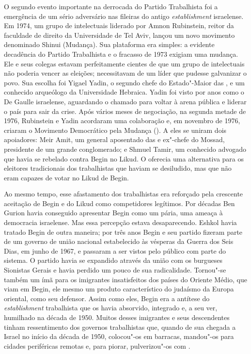 O segundo evento importante na derrocada do Partido Trabalhista foi a
emergência de um sério adversário nas fileiras do antigo
\emph{establishment} israelense. Em 1974, um grupo de intelectuais
liderado por Amnon Rubinstein, reitor da faculdade de direito da
Universidade de Tel Aviv, lançou um novo movimento denominado Shinui
(Mudança). Sua plataforma era simples: a evidente decadência do Partido
Trabalhista e o fracasso de 1973 exigiam uma mudança. Ele e seus
colegas estavam perfeitamente cientes de que um grupo de intelectuais não
poderia vencer as eleições; necessitavam de um líder que pudesse
galvanizar o povo. Sua escolha foi Yigael Yadin, o segundo chefe do
Estado"-Maior das , e um conhecido arqueólogo da Universidade
Hebraica. Yadin foi visto por anos como o De Gaulle israelense,
aguardando o chamado para voltar à arena pública e liderar o país para
sair da crise. Após vários meses de negociação, na segunda metade de
1976, Rubinstein e Yadin acordaram uma colaboração e, em novembro de
1976, criaram o Movimento Democrático pela Mudança (). A eles se
uniram dois apoiadores: Meir Amit, um general aposentado das  e
ex"-chefe do Mossad, presidente de um grande conglomerado; e Shmuel
Tamir, um conhecido advogado que havia se rebelado contra Begin no
Likud. O  oferecia uma alternativa para os eleitores tradicionais dos
trabalhistas que haviam se desiludido, mas que não eram capazes de votar
no Likud de Begin.

Ao mesmo tempo, esse afastamento dos trabalhistas era reforçado pela
crescente aceitação de Begin e do Likud como competidores legítimos. Por
décadas Ben Gurion havia conseguido apresentar Begin como um pária,
uma ameaça à democracia israelense. Mas essa percepção estava
desaparecendo. Eshkol havia tratado Begin de outra maneira; por três
anos Begin e seu partido fizeram parte de um governo de união nacional
estabelecido às vésperas da Guerra dos Seis Dias, em junho de 1967, e
passaram a ser vistos pelo público com parte do sistema. O partido havia
se expandido através da união com os burgueses Sionistas Gerais e havia
perdido um pouco de sua radicalidade. Tornou"-se também um ímã para os
imigrantes insatisfeitos dos países do Oriente Médio, que viam em Begin,
ele mesmo um produto característico do judaísmo da Europa oriental, como
seu defensor. Assim como eles, Begin era a antítese do
\emph{establishment} trabalhista que os havia absorvido, integrado e, a
seu ver, humilhado na década de 1950. Muitos desses imigrantes e seus
descendentes tinham ressentimento dos governos trabalhistas que, quando
de sua chegada a Israel no início da década de 1950, colocou"-os em
barracas, mandou"-os para cidades periféricas remotas e, para piorar,
pulverizou"-os com .

